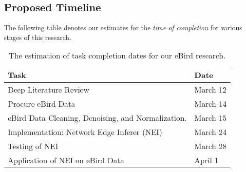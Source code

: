 \documentclass[11pt]{article}
\begin{document}
\begin{multicols}{2}
\section*{Proposed Timeline} \vspace{-10 pt}
The following table denotes our estimates for the \textit{time of completion} for various stages of this research.
\begin{table*}
\centering
\begin{tabular}{|ll|} \hline
Task & Date\\ \hline
Deep Literature Review & March 12  \\
Procure eBird Data & March 14 \\
eBird Data Cleaning, Denoising, and Normalization. & March 15 \\
Implementation: Network Edge Inferer (NEI) &March 24 \\
Testing of NEI & March 28  \\
Application of NEI on eBird Data & April 1 \\

\hline\end{tabular}
\caption{The estimation of task completion dates for our eBird research.}
\label{table:chart}
\end{table*}






\end{multicols}


\end{document}

